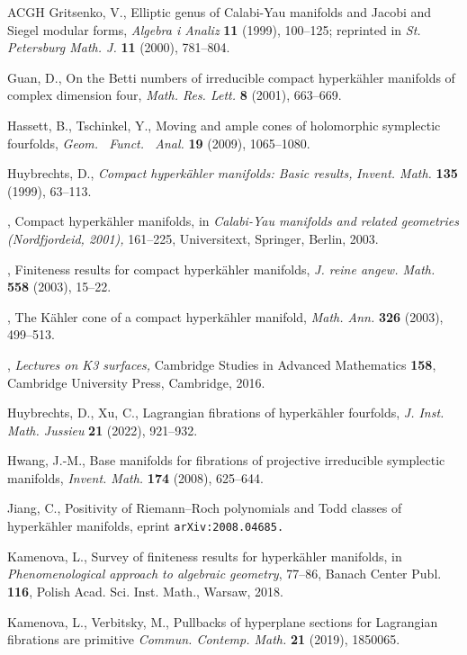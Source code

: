 \documentclass[12pt]{amsart}
\theoremstyle{remark}
\begin{document}
\begin{thebibliography}{ACGH}
 Gritsenko, V., Elliptic genus of Calabi-Yau manifolds and Jacobi and Siegel modular forms, {\em Algebra i
Analiz} {\bf 11} (1999), 100--125; reprinted in {\em St. Petersburg Math. J.} {\bf 11} (2000), 781--804.

 Guan, D., On the Betti numbers of irreducible compact hyperk\"ahler manifolds of complex dimension four, {\em Math. Res. Lett.} {\bf 8} (2001), 663--669.

 Hassett, B., Tschinkel, Y., Moving and ample cones of holomorphic symplectic fourfolds, {\it Geom.~ Funct.~ Anal.} {\bf 19} (2009), 1065--1080.



 Huybrechts, D., {\it Compact hyperk\"ahler manifolds: Basic results,} {\it Invent. Math.} {\bf 135} (1999), 63--113.

 \bysame, Compact hyperk\"ahler manifolds, in {\em Calabi-Yau manifolds and related geometries (Nordfjordeid, 2001),} 161--225, Universitext, Springer, Berlin, 2003.

 \bysame, Finiteness results for compact hyperk\"ahler manifolds, {\it J. reine angew. Math.} {\bf558} (2003), 15--22.

 \bysame, The K\"ahler cone of a compact hyperk\"ahler manifold, {\it Math. Ann.} {\bf 326} (2003), 499--513.

 \bysame, {\it Lectures on K3 surfaces,} Cambridge Studies in Advanced Mathematics {\bf 158},  Cambridge University Press, Cambridge, 2016.

 Huybrechts, D., Xu, C., Lagrangian fibrations of hyperk\"ahler fourfolds, {\em J. Inst. Math. Jussieu} {\bf 21} (2022), 921--932.

 Hwang, J.-M., Base manifolds for fibrations of projective irreducible symplectic manifolds,  {\em Invent. Math.}  {\bf174} (2008),  625--644.

 Jiang, C., Positivity of Riemann--Roch polynomials and Todd classes of hyperk\"ahler manifolds, eprint {\tt arXiv:2008.04685.}

 Kamenova, L., Survey of finiteness results for hyperk\"ahler manifolds, in {\it Phenomenological approach to algebraic geometry}, 77--86, Banach Center Publ. {\bf 116}, Polish Acad. Sci. Inst. Math., Warsaw, 2018.

 Kamenova, L., Verbitsky, M., Pullbacks of hyperplane sections for Lagrangian fibrations are primitive {\it Commun. Contemp. Math.}  {\bf21} (2019),  1850065.


\end{thebibliography}
\end{document}
